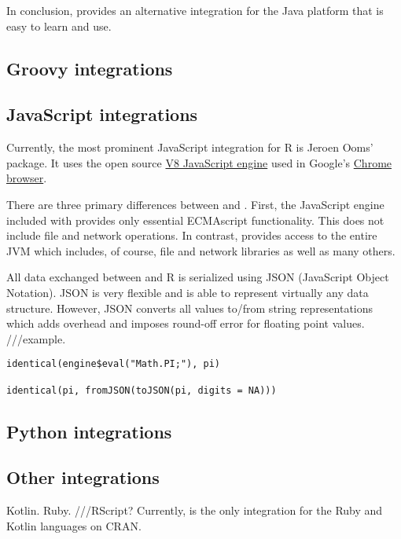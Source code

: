 In conclusion,  provides an alternative integration for the Java platform that is easy to learn and use.

\subsection{Groovy integrations}

\subsection{JavaScript integrations}

Currently, the most prominent JavaScript integration for R is Jeroen Ooms'  package. It uses the open source \href{https://developers.google.com/v8/}{V8 JavaScript engine} used in Google's \href{https://www.google.com/chrome/browser/features.html}{Chrome browser}.

There are three primary differences between  and . First, the JavaScript engine included with  provides only essential ECMAscript functionality. This does not include file and network operations. In contrast,  provides access to the entire JVM which includes, of course, file and network libraries as well as many others.

All data exchanged between  and R is serialized using JSON (JavaScript Object Notation). JSON is very flexible and is able to represent virtually any data structure. However, JSON converts all values to/from string representations which adds overhead and imposes round-off error for floating point values. ///example.

\begin{verbatim}
identical(engine$eval("Math.PI;"), pi)

identical(pi, fromJSON(toJSON(pi, digits = NA)))
\end{verbatim}

\subsection{Python integrations}

\subsection{Other integrations}
Kotlin. Ruby. ///RScript?
Currently,  is the only integration for the Ruby and Kotlin languages on CRAN.%

